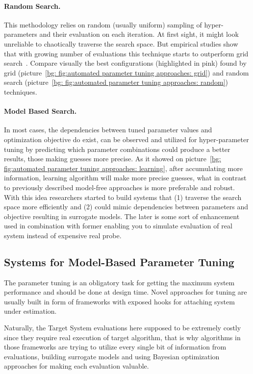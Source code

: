 \paragraph{Random Search.} This methodology relies on random (usually uniform) sampling of hyper-parameters and their evaluation on each iteration. At first sight, it might look unreliable to chaotically traverse the search space. But empirical studies show that with growing number of evaluations this technique starts to outperform grid search~\cite{bergstra2012random}. Compare visually the best configurations (highlighted in pink) found by grid (picture~\ref{bg: fig:automated parameter tuning approaches: grid}) and random search (picture~\ref{bg: fig:automated parameter tuning approaches: random}) techniques.

\paragraph{Model Based Search.} In most cases, the dependencies between tuned parameter values and optimization objective do exist, can be observed and utilized for hyper-parameter tuning by predicting which parameter combinations could produce a better results, those making guesses more precise. As it showed on picture~\ref{bg: fig:automated parameter tuning approaches: learning}, after accumulating more information, learning algorithm will make more precise guesses, what in contrast to previously described model-free approaches is more preferable and robust.
With this idea researchers started to build systems that (1) traverse the search space more efficiently and (2) could mimic dependencies between parameters and objective resulting in surrogate models. The later is some sort of enhancement used in combination with former enabling you to simulate evaluation of real system instead of expensive real probe.



\subsection{Systems for Model-Based Parameter Tuning}\label{bg: parameter tuning expamples}
The parameter tuning is an obligatory task for getting the maximum system performance and should be done at design time.
Novel approaches for tuning are usually built in form of frameworks with exposed hooks for attaching system under estimation.

Naturally, the Target System evaluations here supposed to be extremely costly since they require real execution of target algorithm, that is why algorithms in those frameworks are trying to utilize every single bit of information from evaluations, building surrogate models and using Bayesian optimization approaches for making each evaluation valuable.

